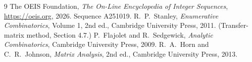 \documentclass[11pt,a4paper]{article}
\theoremstyle{plain}
\theoremstyle{definition}
\begin{document}
\begin{thebibliography}{9}
 The OEIS Foundation, \emph{The On-Line Encyclopedia of Integer
Sequences}, \url{https://oeis.org}, 2026. Sequence A251019.
 R.~P.~Stanley, \emph{Enumerative Combinatorics}, Volume 1, 2nd ed.,
Cambridge University Press, 2011. (Transfer-matrix method, Section 4.7.)
 P.~Flajolet and R.~Sedgewick, \emph{Analytic Combinatorics}, Cambridge
University Press, 2009.
 R.~A.~Horn and C.~R.~Johnson, \emph{Matrix Analysis}, 2nd ed., Cambridge
University Press, 2013.
\end{thebibliography}
\end{document}
